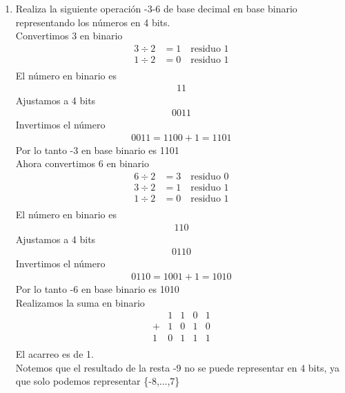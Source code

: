 \documentclass{article}
\begin{document}
\begin{enumerate}
    \item Realiza la siguiente operación -3-6 de base decimal en base binario representando los números en 4 bits. \\
    Convertimos 3 en binario
    \begin{align*}
    3 \div 2 &= 1 \quad \text{residuo } 1 \\
    1 \div 2 &= 0 \quad \text{residuo } 1 \\
    \end{align*}
    El número en binario es
    \begin{align*}
        11
    \end{align*}
    Ajustamos a 4 bits
    \begin{align*}
        0011
    \end{align*}
    Invertimos el número
    \begin{align*}
        0011 = 1100 + 1 = 1101
    \end{align*}
    Por lo tanto -3 en base binario es 1101 \\
    Ahora convertimos 6 en binario
    \begin{align*}
    6 \div 2 &= 3 \quad \text{residuo } 0 \\
    3 \div 2 &= 1 \quad \text{residuo } 1 \\
    1 \div 2 &= 0 \quad \text{residuo } 1 \\
    \end{align*}
    El número en binario es
    \begin{align*}
        110
    \end{align*}
    Ajustamos a 4 bits
    \begin{align*}
        0110
    \end{align*}
    Invertimos el número
    \begin{align*}
        0110 = 1001 + 1 = 1010
    \end{align*}
    Por lo tanto -6 en base binario es 1010 \\
    Realizamos la suma en binario
    \[\begin{array}{cccccc}
    & 1 & 1 & 0 & 1 \\
    + & 1 & 0 & 1 & 0 \\
    \hline
    1 & 0 & 1 & 1 & 1 \\
    \end{array}\]
    El acarreo es de 1.\\
    Notemos que el resultado de la resta -9 no se puede representar en 4 bits, ya que solo podemos representar \{-8,...,7\}

\end{enumerate}
\end{document}
